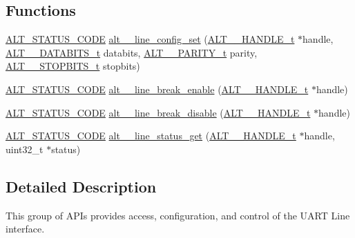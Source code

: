 \subsection*{Functions}
\begin{DoxyCompactItemize}
\item 
\mbox{\hyperlink{hwlib_8h_abdb0d369f069723ca55d6c94bcaaaa12}{A\+L\+T\+\_\+\+S\+T\+A\+T\+U\+S\+\_\+\+C\+O\+DE}} \mbox{\hyperlink{group__UART__LINE_ga2f0389c496161763a16d13842d9ea0ab}{alt\+\_\+\_\+line\+\_\+config\+\_\+set}} (\mbox{\hyperlink{group__UART__BASIC_ga4173f362f19fc04032c3859b78d78119}{A\+L\+T\+\_\+\_\+\+H\+A\+N\+D\+L\+E\+\_\+t}} $\ast$handle, \mbox{\hyperlink{group__UART__LINE_ga1e6b5e04034d586d0a66297b152a43c4}{A\+L\+T\+\_\+\_\+\+D\+A\+T\+A\+B\+I\+T\+S\+\_\+t}} databits, \mbox{\hyperlink{group__UART__LINE_ga40ed81a89ceaf6e4ef0ec49c16415bf3}{A\+L\+T\+\_\+\_\+\+P\+A\+R\+I\+T\+Y\+\_\+t}} parity, \mbox{\hyperlink{group__UART__LINE_gaf2b594c54a5c750b62111afe25088c81}{A\+L\+T\+\_\+\_\+\+S\+T\+O\+P\+B\+I\+T\+S\+\_\+t}} stopbits)
\item 
\mbox{\hyperlink{hwlib_8h_abdb0d369f069723ca55d6c94bcaaaa12}{A\+L\+T\+\_\+\+S\+T\+A\+T\+U\+S\+\_\+\+C\+O\+DE}} \mbox{\hyperlink{group__UART__LINE_gaf5d846b85f79c13c8c673552080be841}{alt\+\_\+\_\+line\+\_\+break\+\_\+enable}} (\mbox{\hyperlink{group__UART__BASIC_ga4173f362f19fc04032c3859b78d78119}{A\+L\+T\+\_\+\_\+\+H\+A\+N\+D\+L\+E\+\_\+t}} $\ast$handle)
\item 
\mbox{\hyperlink{hwlib_8h_abdb0d369f069723ca55d6c94bcaaaa12}{A\+L\+T\+\_\+\+S\+T\+A\+T\+U\+S\+\_\+\+C\+O\+DE}} \mbox{\hyperlink{group__UART__LINE_ga448e8d9d2c31756d7ce766b2aa5e2f91}{alt\+\_\+\_\+line\+\_\+break\+\_\+disable}} (\mbox{\hyperlink{group__UART__BASIC_ga4173f362f19fc04032c3859b78d78119}{A\+L\+T\+\_\+\_\+\+H\+A\+N\+D\+L\+E\+\_\+t}} $\ast$handle)
\item 
\mbox{\hyperlink{hwlib_8h_abdb0d369f069723ca55d6c94bcaaaa12}{A\+L\+T\+\_\+\+S\+T\+A\+T\+U\+S\+\_\+\+C\+O\+DE}} \mbox{\hyperlink{group__UART__LINE_gae108dc72c29861f56514d4204d52c0ed}{alt\+\_\+\_\+line\+\_\+status\+\_\+get}} (\mbox{\hyperlink{group__UART__BASIC_ga4173f362f19fc04032c3859b78d78119}{A\+L\+T\+\_\+\_\+\+H\+A\+N\+D\+L\+E\+\_\+t}} $\ast$handle, uint32\+\_\+t $\ast$status)
\end{DoxyCompactItemize}


\subsection{Detailed Description}
This group of A\+P\+Is provides access, configuration, and control of the U\+A\+RT Line interface. 

